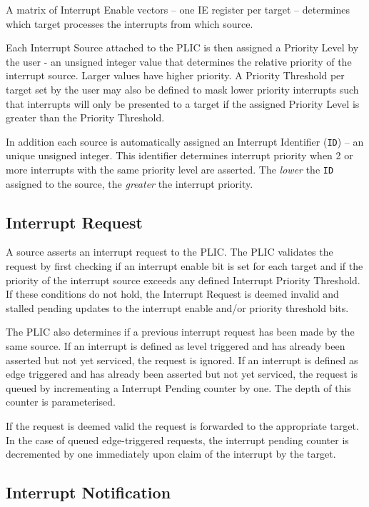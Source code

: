 A matrix of Interrupt Enable vectors -- one IE register per target --
determines which target processes the interrupts from which source.

Each Interrupt Source attached to the PLIC is then assigned a Priority
Level by the user - an unsigned integer value that determines the relative priority of
the interrupt source. Larger values have higher priority. A Priority Threshold 
per target set by the user may also be defined to mask lower priority interrupts such that 
interrupts will only be presented to a target if the assigned Priority Level 
is greater than the Priority Threshold.

In addition each source is automatically assigned an Interrupt Identifier
(\texttt{ID}) -- an unique unsigned integer. This identifier determines
interrupt priority when 2 or more interrupts with the same priority
level are asserted. The \emph{lower} the \texttt{ID} assigned to the source,
the \emph{greater} the interrupt priority.

\subsection{Interrupt Request}

A source asserts an interrupt request to the PLIC. The PLIC validates
the request by first checking if an interrupt enable bit is set for each
target and if the priority of the interrupt source exceeds any defined
Interrupt Priority Threshold. If these conditions do not hold, the
Interrupt Request is deemed invalid and stalled pending updates to the interrupt enable and/or priority threshold bits. 

The PLIC also determines if a previous interrupt request has been made
by the same source. If an interrupt is defined as level triggered and
has already been asserted but not yet serviced, the request is ignored.
If an interrupt is defined as edge triggered and has already been
asserted but not yet serviced, the request is queued by incrementing a
Interrupt Pending counter by one. The depth of this counter is
parameterised.

If the request is deemed valid the request is forwarded to the
appropriate target. In the case of queued edge-triggered requests, the
interrupt pending counter is decremented by one immediately upon claim of the interrupt by the target.

\subsection{Interrupt Notification}

